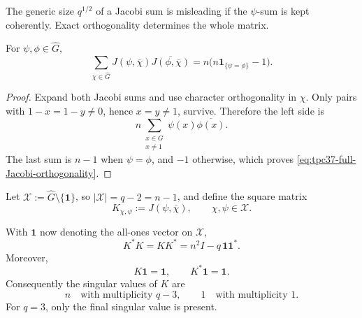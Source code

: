 The generic size \(q^{1/2}\) of a Jacobi sum is misleading if the
\(\psi\)-sum is kept coherently.  Exact orthogonality determines the
whole matrix.

\begin{lemma}
\label{lem:tpc37-full-Jacobi-orthogonality}
For \(\psi,\phi\in\widehat G\),
\begin{equation}
 \sum_{\chi\in\widehat G}
 J(\psi,\overline\chi)
 \overline{J(\phi,\overline\chi)}
 =n\bigl(n\mathbf1_{\{\psi=\phi\}}-1\bigr).
 \label{eq:tpc37-full-Jacobi-orthogonality}
\end{equation}
\end{lemma}

\begin{proof}
Expand both Jacobi sums and use character orthogonality in \(\chi\).
Only pairs with \(1-x=1-y\ne0\), hence \(x=y\ne1\), survive.  Therefore
the left side is
\[
 n\sum_{\substack{x\in G\\x\ne1}}
 \psi(x)\overline{\phi(x)}.
\]
The last sum is \(n-1\) when \(\psi=\phi\), and \(-1\) otherwise,
which proves \eqref{eq:tpc37-full-Jacobi-orthogonality}.
\end{proof}

Let \(\mathscr X:=\widehat G\setminus\{\mathbf1\}\), so
\(|\mathscr X|=q-2=n-1\), and define the square matrix
\begin{equation}
 K_{\chi,\psi}:=J(\psi,\overline\chi),
 \qquad \chi,\psi\in\mathscr X.
 \label{eq:tpc37-K-definition}
\end{equation}

\begin{theorem}
\label{thm:tpc37-Jacobi-near-unitary}
With \(\mathbf 1\) now denoting the all-ones vector on \(\mathscr X\),
\begin{equation}
 \boxed{
 K^*K=KK^*=n^2I-q\,\mathbf1\mathbf1^*.}
 \label{eq:tpc37-K-Gram}
\end{equation}
Moreover,
\begin{equation}
 K\mathbf1=\mathbf1,
 \qquad K^*\mathbf1=\mathbf1.
 \label{eq:tpc37-K-flat-vector}
\end{equation}
Consequently the singular values of \(K\) are
\begin{equation}
 n\quad\text{with multiplicity }q-3,
 \qquad
 1\quad\text{with multiplicity }1.
 \label{eq:tpc37-K-singular-values}
\end{equation}
For \(q=3\), only the final singular value is present.
\end{theorem}

